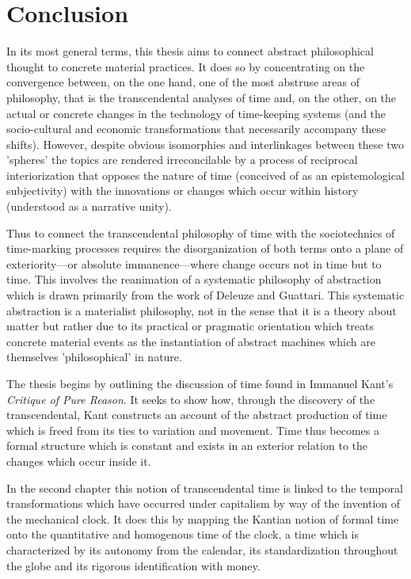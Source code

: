 \chapter{Conclusion}

In its most general terms, this thesis aims to connect abstract philosophical thought to concrete material practices. It does so by concentrating on the convergence between, on the one hand, one of the most abstruse areas of philosophy, that is the transcendental analyses of time and, on the other, on the actual or concrete changes in the technology of time-keeping systems (and the socio-cultural and economic transformations that necessarily accompany these shifts). However, despite obvious isomorphies and interlinkages between these two 'spheres' the topics are rendered irreconcilable by a process of reciprocal interiorization that opposes the nature of time (conceived of as an epistemological subjectivity) with the innovations or changes which occur within history (understood as a narrative unity).

Thus to connect the transcendental philosophy of time with the sociotechnics of time-marking processes requires the disorganization of both terms onto a plane of exteriority---or absolute immanence---where change occurs not in time but to time. This involves the reanimation of a systematic philosophy of abstraction which is drawn primarily from the work of Deleuze and Guattari. This systematic abstraction is a materialist philosophy, not in the sense that it is a theory about matter but rather due to its practical or pragmatic orientation which treats concrete material events as the instantiation of abstract machines which are themselves 'philosophical' in nature.

The thesis begins by outlining the discussion of time found in Immanuel Kant's \textit{Critique of Pure Reason}. It seeks to show how, through the discovery of the transcendental, Kant constructs an account of the abstract production of time which is freed from its ties to variation and movement. Time thus becomes a formal structure which is constant and exists in an exterior relation to the changes which occur inside it.

In the second chapter this notion of transcendental time is linked to the temporal transformations which have occurred under capitalism by way of the invention of the mechanical clock. It does this by mapping the Kantian notion of formal time onto the quantitative and homogenous time of the clock, a time which is characterized by its autonomy from the calendar, its standardization throughout the globe and its rigorous identification with money.

